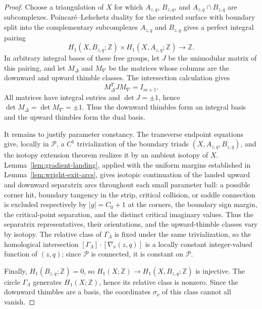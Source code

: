 \documentclass[reqno]{article}
\theoremstyle{definition}
\theoremstyle{remark}
\theoremstyle{plain}
\begin{document}
\begin{proof}
Choose a triangulation of $X$ for which $A_{z,q}$, $B_{z,q}$, and $A_{z,q}\cap B_{z,q}$ are subcomplexes. Poincar\'e--Lefschetz duality for the oriented surface with boundary split into the complementary subcomplexes $A_{z,q}$ and $B_{z,q}$ gives a perfect integral pairing
$$H_1(X,B_{z,q};\mathbb Z)\times H_1(X,A_{z,q};\mathbb Z)\longrightarrow\mathbb Z.$$
In arbitrary integral bases of these free groups, let $J$ be the unimodular matrix of this pairing, and let $M_\Delta$ and $M_\nabla$ be the matrices whose columns are the downward and upward thimble classes. The intersection calculation gives
$$M_\Delta^{T}JM_\nabla=I_{m+1}.$$
All matrices have integral entries and $\det J=\pm1$, hence $\det M_\Delta=\det M_\nabla=\pm1$. Thus the downward thimbles form an integral basis and the upward thimbles form the dual basis.

It remains to justify parameter constancy. The transverse endpoint equations give, locally in $\mathcal P$, a $C^1$ trivialization of the boundary triads $(X,A_{z,q},B_{z,q})$, and the isotopy extension theorem realizes it by an ambient isotopy of $X$. Lemma~\ref{lem:gradient-landing}, applied with the uniform margins established in Lemma~\ref{lem:wright-exit-arcs}, gives isotopic continuation of the landed upward and downward separatrix arcs throughout each small parameter ball: a possible corner hit, boundary tangency in the strip, critical collision, or saddle connection is excluded respectively by $|g|=C_0+1$ at the corners, the boundary sign margin, the critical-point separation, and the distinct critical imaginary values. Thus the separatrix representatives, their orientations, and the upward-thimble classes vary by isotopy. The relative class of $\Gamma_\Lambda$ is fixed under the same trivialization, so the homological intersection $[\Gamma_\Lambda]\cdot[\nabla_\nu(z,q)]$ is a locally constant integer-valued function of $(z,q)$; since $\mathcal P$ is connected, it is constant on $\mathcal P$.

Finally, $H_1(B_{z,q};\mathbb Z)=0$, so $H_1(X;\mathbb Z)\to H_1(X,B_{z,q};\mathbb Z)$ is injective. The circle $\Gamma_\Lambda$ generates $H_1(X;\mathbb Z)$, hence its relative class is nonzero. Since the downward thimbles are a basis, the coordinates $\sigma_\nu$ of this class cannot all vanish.
\end{proof}
\end{document}

